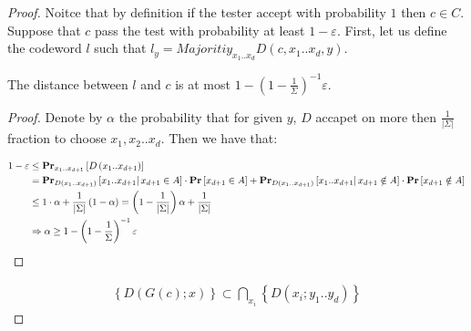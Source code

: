 \begin{proof}
  Noitce that by definition if the tester accept with probability $1$ then $c \in C$. Suppose that $c$ pass the test with probability at least $1 - \varepsilon$. First, let us define the codeword $l$ such that $ l_{y} = Majoritiy_{x_1 .. x_{d}}D\left(c, x_{1}.. x_{d},y\right)$.

  \begin{claim} 
    The distance between $l$ and $c$ is at most $ 1- \left( 1 - \frac{1}{\Sigma} \right)^{-1}\varepsilon$.  
  \end{claim}
  \begin{proof} 
    Denote by $\alpha$ the probability that for given $y$, $D$ accapet on more then $\frac{1}{|\Sigma|}$ fraction to choose $x_{1},x_{2}..x_{d}$. 
    Then we have that:  
    
    \begin{equation*}
      \begin{split}
        1 - \varepsilon  & \le \prbm{ D\left( x_1 .. x_{d+1} \right) }{x_1 .. x_{d+1}}  \\
        & = \prbcprb{  D\left( x_1 .. x_{d+1} \right)}{ x_1 .. x_{d+1}  }{ x_{d+1} \in A } + \prbcprb{ D\left( x_1 .. x_{d+1} \right)}{ x_1 .. x_{d+1}   }{ x_{d+1} \notin A } \\
        & \le 1 \cdot \alpha +  \frac{1}{|\Sigma|}  \left( 1 - \alpha \right) = \left( 1 - \frac{1}{|\Sigma|} \right) \alpha  + \frac{1}{|\Sigma|} \\
       & \Rightarrow \alpha \ge  1- \left( 1 - \frac{1}{\Sigma} \right)^{-1}\varepsilon
      \end{split}
    \end{equation*}
  \end{proof} 

  \begin{equation*}
    \begin{split}
      \left\{ D(G(c) ; x ) \right\} \subset \bigcap_{ x_{i} } \left\{ D\left( x_{i} ; y_{1} .. y_{d} \right)  \right\} 
    \end{split}
  \end{equation*}
\end{proof}


